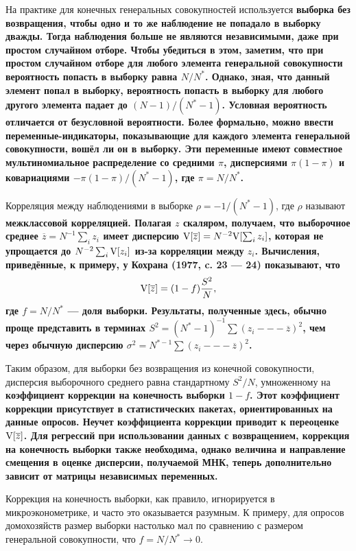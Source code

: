 На практике для конечных генеральных совокупностей используется \bfseries выборка без возвращения\mdseries, чтобы одно и то же наблюдение не попадало в выборку дважды. Тогда наблюдения больше не являются независимыми, даже при простом случайном отборе. Чтобы убедиться в этом, заметим, что при простом случайном отборе для любого элемента генеральной совокупности вероятность попасть в выборку равна $N/N^*$. Однако, зная, что данный элемент попал в выборку, вероятность попасть в выборку для любого другого элемента падает до $(N-1)/(N^*-1)$. Условная вероятность отличается от безусловной вероятности. Более формально, можно ввести переменные-индикаторы, показывающие для каждого элемента генеральной совокупности, вошёл ли он в выборку. Эти переменные имеют совместное мультиномиальное распределение со средними $\pi$, дисперсиями $\pi(1-\pi)$ и ковариациями $-\pi(1-\pi)/(N^*-1)$, где $\pi=N/N^*$.

Корреляция между наблюдениями в выборке $\rho = -1/(N^*-1)$, где $\rho$ называют \bfseries межклассовой корреляцией\mdseries. Полагая $z$ скаляром, получаем, что выборочное среднее $\overline{z} = N^{-1} \sum_i z_i$ имеет дисперсию $\mathrm{V}[\overline{z}] = N^{-2} \mathrm{V}[\sum_i z_i]$, которая не упрощается до $N^{-2} \sum_i \mathrm{V}[z_i]$ из-за корреляции между $z_i$. Вычисления, приведённые, к примеру, у Кохрана (1977, c. 23 --- 24) показывают, что 
$$\mathrm{V}[\overline{z}] = (1-f) \frac{S^2}{N},$$
где $f = N/N^*$ --- доля выборки. Результаты, полученные здесь, обычно проще представить в терминах $S^2 = (N^*-1)^{-1}\sum(z_i --- \overline{z})^2$, чем через обычную дисперсию  $\sigma^2 = N^{*-1}\sum(z_i --- \overline{z})^2$. 

Таким образом, для выборки без возвращения из конечной совокупности, дисперсия выборочного среднего равна стандартному $S^2/N$, умноженному на \bfseries коэффициент коррекции на конечность выборки \mdseries $1-f$. Этот коэффициент коррекции присутствует в статистических пакетах, ориентированных на данные опросов. Неучет коэффициента коррекции приводит к переоценке $\mathrm{V}[\overline{z}]$. Для регрессий при использовании данных с возвращением, коррекция на конечность выборки также необходима, однако величина и направление смещения в оценке дисперсии, получаемой МНК, теперь дополнительно зависит от матрицы независимых переменных. 

Коррекция на конечность выборки, как правило, игнорируется в микроэконометрике, и часто это оказывается разумным. К примеру, для опросов домохозяйств размер выборки настолько мал по сравнению с размером генеральной совокупности, что $f = N/N^* \to 0$.

